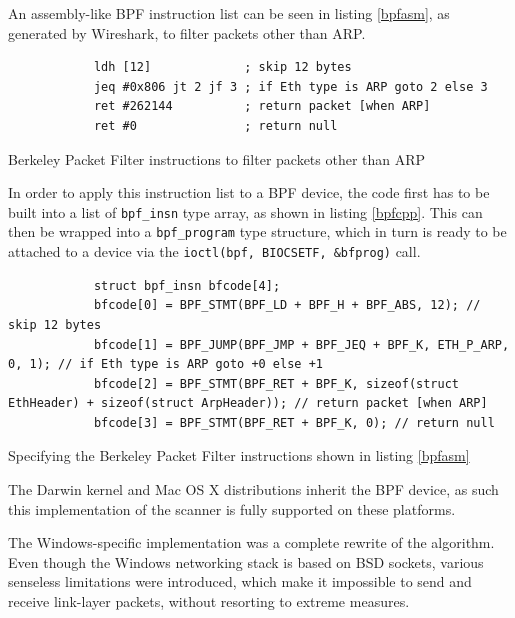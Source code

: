 \documentclass[a4paper,12pt]{article}
\begin{document}
	An assembly-like BPF instruction list can be seen in listing \ref{bpfasm}, as generated by Wireshark, to filter packets other than ARP.
	
	\begin{listing}[H]
		\begin{verbatim}
			ldh [12]             ; skip 12 bytes
			jeq #0x806 jt 2 jf 3 ; if Eth type is ARP goto 2 else 3
			ret #262144          ; return packet [when ARP]
			ret #0               ; return null
		\end{verbatim}
		\caption{Berkeley Packet Filter instructions to filter packets other than ARP}
		\label{bpfasm}
	\end{listing}
	
	In order to apply this instruction list to a BPF device, the code first has to be built into a list of \texttt{bpf_insn} type array, as shown in listing \ref{bpfcpp}. This can then be wrapped into a \texttt{bpf_program} type structure, which in turn is ready to be attached to a device via the \texttt{ioctl(bpf, BIOCSETF, &bfprog)} call.
	
	\begin{listing}[H]
		\begin{verbatim}
			struct bpf_insn bfcode[4];
			bfcode[0] = BPF_STMT(BPF_LD + BPF_H + BPF_ABS, 12); // skip 12 bytes
			bfcode[1] = BPF_JUMP(BPF_JMP + BPF_JEQ + BPF_K, ETH_P_ARP, 0, 1); // if Eth type is ARP goto +0 else +1
			bfcode[2] = BPF_STMT(BPF_RET + BPF_K, sizeof(struct EthHeader) + sizeof(struct ArpHeader)); // return packet [when ARP]
			bfcode[3] = BPF_STMT(BPF_RET + BPF_K, 0); // return null
		\end{verbatim}
		\caption{Specifying the Berkeley Packet Filter instructions shown in listing \ref{bpfasm}}
		\label{bpfcpp}
	\end{listing}
	
	The Darwin kernel and Mac OS X distributions inherit the BPF device, as such this implementation of the scanner is fully supported on these platforms.

 

	The Windows-specific implementation was a complete rewrite of the algorithm. Even though the Windows networking stack is based on BSD sockets, various senseless limitations were introduced, which make it impossible to send and receive link-layer packets, without resorting to extreme measures.
\end{document}

